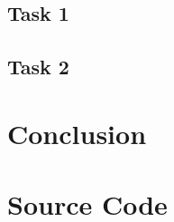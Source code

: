 \documentclass{article}
\begin{document}
\subsection{Task 1}
\label{sec:val-1}

\subsection{Task 2}
\label{sec:val-2}

\section{Conclusion}
\label{sec:conclusion}

\clearpage



\appendix

\section{Source Code}
\label{sec:source-code}
\end{document}
